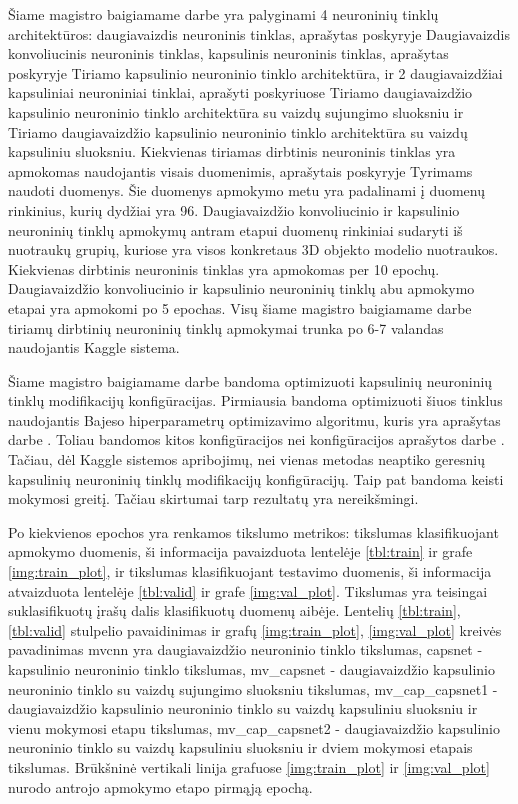 
Šiame magistro baigiamame darbe yra palyginami 4 neuroninių tinklų architektūros: daugiavaizdis neuroninis tinklas, aprašytas poskyryje Daugiavaizdis konvoliucinis neuroninis tinklas, kapsulinis neuroninis tinklas, aprašytas poskyryje Tiriamo kapsulinio neuroninio tinklo architektūra, ir 2 daugiavaizdžiai kapsuliniai neuroniniai tinklai, aprašyti poskyriuose Tiriamo daugiavaizdžio kapsulinio neuroninio tinklo architektūra su vaizdų sujungimo sluoksniu ir Tiriamo daugiavaizdžio kapsulinio neuroninio tinklo architektūra su vaizdų kapsuliniu sluoksniu. Kiekvienas tiriamas dirbtinis neuroninis tinklas yra apmokomas naudojantis visais duomenimis, aprašytais poskyryje Tyrimams naudoti duomenys. Šie duomenys apmokymo metu yra padalinami į duomenų rinkinius, kurių dydžiai yra 96. Daugiavaizdžio konvoliucinio ir kapsulinio neuroninių tinklų apmokymų antram etapui duomenų rinkiniai sudaryti iš nuotraukų grupių, kuriose yra visos konkretaus 3D objekto modelio nuotraukos. Kiekvienas dirbtinis neuroninis tinklas yra apmokomas per 10 epochų. Daugiavaizdžio konvoliucinio ir kapsulinio neuroninių tinklų abu apmokymo etapai yra apmokomi po 5 epochas. Visų šiame magistro baigiamame darbe tiriamų dirbtinių neuroninių tinklų apmokymai trunka po 6-7 valandas naudojantis Kaggle sistema.

Šiame magistro baigiamame darbe bandoma optimizuoti kapsulinių neuroninių tinklų modifikacijų konfigūracijas. Pirmiausia bandoma optimizuoti šiuos tinklus naudojantis Bajeso hiperparametrų optimizavimo algoritmu, kuris yra aprašytas darbe \cite{bayes}. Toliau bandomos kitos konfigūracijos nei konfigūracijos aprašytos darbe \cite{capsNet}. Tačiau, dėl Kaggle sistemos apribojimų, nei vienas metodas neaptiko geresnių kapsulinių neuroninių tinklų modifikacijų konfigūracijų. Taip pat bandoma 
keisti mokymosi greitį. Tačiau skirtumai tarp rezultatų yra nereikšmingi.

Po kiekvienos epochos yra renkamos tikslumo metrikos: tikslumas klasifikuojant apmokymo duomenis, ši informacija pavaizduota lentelėje \ref{tbl:train} ir grafe \ref{img:train_plot}, ir tikslumas klasifikuojant testavimo duomenis, ši informacija atvaizduota lentelėje \ref{tbl:valid} ir grafe \ref{img:val_plot}. Tikslumas yra teisingai suklasifikuotų įrašų dalis klasifikuotų duomenų aibėje. Lentelių \ref{tbl:train}, \ref{tbl:valid} stulpelio pavaidinimas ir grafų \ref{img:train_plot}, \ref{img:val_plot} kreivės pavadinimas mvcnn yra daugiavaizdžio neuroninio tinklo tikslumas, capsnet - kapsulinio neuroninio tinklo tikslumas, mv\_capsnet - daugiavaizdžio kapsulinio neuroninio tinklo su vaizdų sujungimo sluoksniu tikslumas, mv\_cap\_capsnet1 - daugiavaizdžio kapsulinio neuroninio tinklo su vaizdų kapsuliniu sluoksniu ir vienu mokymosi etapu tikslumas, mv\_cap\_capsnet2 - daugiavaizdžio kapsulinio neuroninio tinklo su vaizdų kapsuliniu sluoksniu ir dviem mokymosi etapais tikslumas. Brūkšninė vertikali linija grafuose \ref{img:train_plot} ir \ref{img:val_plot} nurodo antrojo apmokymo etapo pirmąją epochą.

